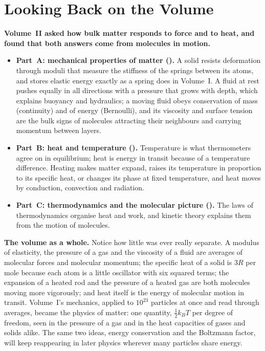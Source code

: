 \section*{Looking Back on the Volume}

\textbf{Volume~II asked how bulk matter responds to force and to heat, and found that both answers come
from molecules in motion.}
\begin{itemize}
\item \textbf{Part~A: mechanical properties of matter ().} A solid resists
deformation through moduli that measure the stiffness of the springs between its atoms, and stores
elastic energy exactly as a spring does in Volume~I. A fluid at rest pushes equally in all directions
with a pressure that grows with depth, which explains buoyancy and hydraulics; a moving fluid obeys
conservation of mass (continuity) and of energy (Bernoulli), and its viscosity and surface tension are the bulk signs of molecules attracting their neighbours and carrying momentum between layers.
\item \textbf{Part~B: heat and temperature ().} Temperature is what thermometers agree
on in equilibrium; heat is energy in transit because of a temperature difference. Heating makes matter
expand, raises its temperature in proportion to its specific heat, or changes its phase at fixed
temperature, and heat moves by conduction, convection and radiation.
\item \textbf{Part~C: thermodynamics and the molecular picture ().} The laws
of thermodynamics organise heat and work, and kinetic theory explains them from the motion of molecules.
\end{itemize}

\medskip
\textbf{The volume as a whole.} Notice how little was ever really separate. A modulus of elasticity, the pressure of a gas and the viscosity of a fluid are averages of molecular forces and molecular momentum; the specific heat of a solid is $3R$ per mole because each atom is a little oscillator with six
squared terms; the expansion of a heated rod and the pressure of a heated gas are both molecules moving
more vigorously; and heat itself is the energy of molecular motion in transit. Volume~I's mechanics,
applied to $10^{23}$ particles at once and read through averages, became the physics of matter: one quantity, $\tfrac12 k_BT$ per degree of freedom, seen in the pressure of a gas and in the heat capacities of gases and solids alike. The same
two ideas, energy conservation and the Boltzmann factor, will keep reappearing in later physics wherever
many particles share energy.

